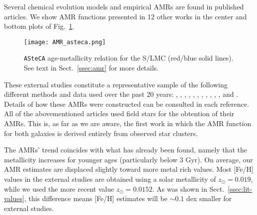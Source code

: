 \documentclass{aa}
\begin{document}
Several chemical evolution models and empirical AMRs are found in published
articles.
We show AMR functions presented in 12 other works in the center and bottom plots
of Fig.~\ref{fig:amr}.
%
\begin{figure}
\centering
\texttt{[image: AMR\_asteca.png]}
\caption{\texttt{ASteCA} age-metallicity relation for the S/LMC (red/blue
solid lines). See text in Sect.~\ref{ssec:amr} for more details.}
\label{fig:amr}
\end{figure}
%
These external studies constitute a representative sample of the following
different methods and data used over the past 20 years:
\citet[][PT98; bursting models]{Pagel_1998}, \citet[][G98; closed-box model
with Holtzman SFH]{Geha_1998}, \citet[][HZ04]{Harris_2004}, \citet[][C08a;
average of four disk frames]{Carrera_2008_lmc}, \citet[][C08b; average of
13 frames]{Carrera_2008_smc}, \citet[][HZ09]{Harris_2009}, \citet[][N09;
5th degree polynomial fit to the AMRs of their three observed regions]
{Noel_2009}, \citet[][TB09; 1: no merger model, 2: equal mass merger, 3: one
to four merger]{Tsujimoto_2009}, \citet[][R12; four tiles average]{Rubele_2012},
\citet[][C13; B: Bologna, C: Cole]{Cignoni_2013}, \citet[][PG13]
{Piatti_Geisler_2013}, and \citet[][M14; 0: field LMC0, 1: field LMC1, 2: field
LMC2]{Meschin_2014}.
Details of how these AMRs were constructed can be consulted in each reference.
%
All of the abovementioned articles used field stars for the obtention
of their AMRs. This is, as far as we are aware, the first work in which the AMR
function for both galaxies is derived entirely from observed star clusters.


The AMRs' trend coincides with what has already been found, namely that the
metallicity increases for younger ages (particularly below 3 Gyr). On average,
our AMR estimates are displaced slightly toward more metal rich values.
Most [Fe/H] values in the external studies are obtained using a solar
metallicity of $z_{\odot}{=}0.019$, while we used the more recent value
$z_{\odot}{=}0.0152$. As was shown in Sect.~\ref{ssec:lit-values}, this
difference means [Fe/H] estimates will be ${\sim}0.1$ dex smaller for external
studies.
\end{document}
